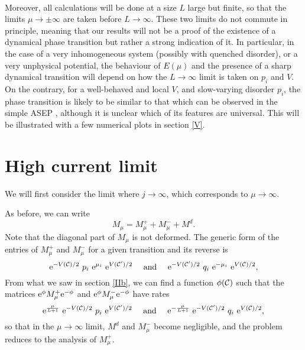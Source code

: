 \documentclass[aps,pre,onecolumn,showpacs,showkeys,a4paper]{revtex4-1}
\begin{document}
~~

Moreover, all calculations will be done at a size $L$ large but finite, so that the limits $\mu\rightarrow\pm\infty$ are taken before $L\rightarrow\infty$. These two limits do not commute in principle, meaning that our results will not be a proof of the existence of a dynamical phase transition but rather a strong indication of it. In particular, in the case of a very inhomogeneous system (possibly with quenched disorder), or a very unphysical potential, the behaviour of $E(\mu)$ and the presence of a sharp dynamical transition will depend on how the $L\rightarrow\infty$ limit is taken on $p_i$ and $V$. On the contrary, for a well-behaved and local $V$, and slow-varying disorder $p_i$, the phase transition is likely to be similar to that which can be observed in the simple ASEP \cite{derrida1999universal,Lazarescu2015}, although it is unclear which of its features are universal. This will be illustrated with a few numerical plots in section \ref{V}.






\newpage

\section{High current limit}
\label{III}

We will first consider the limit where $j\rightarrow\infty$, which corresponds to $\mu\rightarrow\infty$.

As before, we can write
\begin{equation}
M_\mu=M^+_\mu+M^-_\mu+M^d.
\end{equation}
Note that the diagonal part of $M_\mu$ is not deformed. The generic form of the entries of $M^+_\mu$ and $M^-_\mu$ for a given transition and its reverse is
\begin{equation}
{\rm e}^{-V({\cal C})/2}~p_i~{\rm e}^{\mu_i}~{\rm e}^{V({\cal C}')/2}~~~~{\rm and}~~~~{\rm e}^{-V({\cal C}')/2}~q_i~{\rm e}^{-\mu_i}~{\rm e}^{V({\cal C})/2},
\end{equation}
From what we saw in section \ref{IIb}, we can find a function $\phi({\cal C})$ such that the matrices ${\rm e}^{\phi}M^+_\mu{\rm e}^{-\phi}$ and ${\rm e}^{\phi}M^-_\mu{\rm e}^{-\phi}$ have rates
\begin{equation}
{\rm e}^{\frac{\mu}{L+1}}~{\rm e}^{-V({\cal C})/2}~p_i~{\rm e}^{V({\cal C}')/2}~~~~{\rm and}~~~~{\rm e}^{-\frac{\mu}{L+1}}~{\rm e}^{-V({\cal C}')/2}~q_i~{\rm e}^{V({\cal C})/2},
\end{equation}
so that in the $\mu\rightarrow\infty$ limit, $M^d$ and $M^-_\mu$ become negligible, and the problem reduces to the analysis of $M^+_\mu$.
\end{document}
